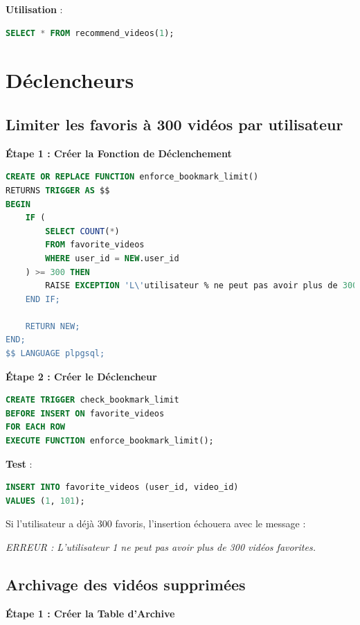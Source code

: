 \documentclass{article}
\begin{document}
\textbf{Utilisation} :

\begin{lstlisting}[language=SQL]
SELECT * FROM recommend_videos(1);
\end{lstlisting}

\section{Déclencheurs}

\subsection{Limiter les favoris à 300 vidéos par utilisateur}

\textbf{Étape 1 : Créer la Fonction de Déclenchement}

\begin{lstlisting}[language=SQL]
CREATE OR REPLACE FUNCTION enforce_bookmark_limit()
RETURNS TRIGGER AS $$
BEGIN
    IF (
        SELECT COUNT(*) 
        FROM favorite_videos 
        WHERE user_id = NEW.user_id
    ) >= 300 THEN
        RAISE EXCEPTION 'L\'utilisateur % ne peut pas avoir plus de 300 vidéos favorites.', NEW.user_id;
    END IF;

    RETURN NEW;
END;
$$ LANGUAGE plpgsql;
\end{lstlisting}

\textbf{Étape 2 : Créer le Déclencheur}

\begin{lstlisting}[language=SQL]
CREATE TRIGGER check_bookmark_limit
BEFORE INSERT ON favorite_videos
FOR EACH ROW
EXECUTE FUNCTION enforce_bookmark_limit();
\end{lstlisting}

\textbf{Test} :

\begin{lstlisting}[language=SQL]
INSERT INTO favorite_videos (user_id, video_id)
VALUES (1, 101);
\end{lstlisting}

Si l'utilisateur a déjà 300 favoris, l'insertion échouera avec le message :

\textit{ERREUR : L'utilisateur 1 ne peut pas avoir plus de 300 vidéos favorites.}

\subsection{Archivage des vidéos supprimées}

\textbf{Étape 1 : Créer la Table d'Archive}
\end{document}
